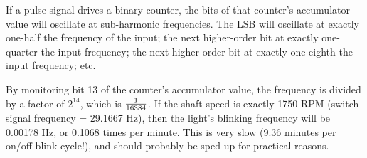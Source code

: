 





If a pulse signal drives a binary counter, the bits of that counter's accumulator value will oscillate at sub-harmonic frequencies.  The LSB will oscillate at exactly one-half the frequency of the input; the next higher-order bit at exactly one-quarter the input frequency; the next higher-order bit at exactly one-eighth the input frequency; etc.

\vskip 10pt

By monitoring bit 13 of the counter's accumulator value, the frequency is divided by a factor of $2^{14}$, which is $1 \over 16384$.  If the shaft speed is exactly 1750 RPM (switch signal frequency = 29.1667 Hz), then the light's blinking frequency will be 0.00178 Hz, or 0.1068 times per minute.  This is very slow (9.36 minutes per on/off blink cycle!), and should probably be sped up for practical reasons.





